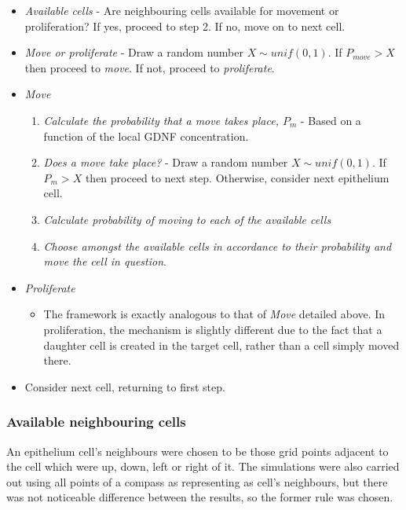 \documentclass[pdftex,10pt,a4paper,twocolumn]{article}
\begin{document}
\begin{itemize}
\item \textit{Available cells} - Are neighbouring cells available for movement or proliferation? If yes, proceed to step 2. If no, move on to next cell. 
\item \textit{Move or proliferate} - Draw a random number $X\sim unif(0,1)$. If $P_{move}>X$ then proceed to \textit{move}. If not, proceed to \textit{proliferate}.
\item \textit{Move} 
\begin{enumerate}
\item \textit{Calculate the probability that a move takes place, $P_m$} - Based on a function of the local GDNF concentration. 
\item \textit{Does a move take place?} - Draw a random number $X\sim unif(0,1)$. If $P_{m}>X$ then proceed to next step. Otherwise, consider next epithelium cell.
\item \textit{Calculate probability of moving to each of the available cells} 
\item \textit{Choose amongst the available cells in accordance to their probability and move the cell in question}.
\end{enumerate} 
\item \textit{Proliferate}
\begin{itemize}
\item The framework is exactly analogous to that of \textit{Move} detailed above. In proliferation, the mechanism is slightly different due to the fact that a daughter cell is created in the target cell, rather than a cell simply moved there.
\end{itemize}
\item Consider next cell, returning to first step.
\end{itemize}

\subsubsection{Available neighbouring cells}\label{sec:available}
An epithelium cell's neighbours were chosen to be those grid points adjacent to the cell which were up, down, left or right of it. The simulations were also carried out using all points of a compass as representing as cell's neighbours, but there was not noticeable difference between the results, so the former rule was chosen. 
\end{document}
